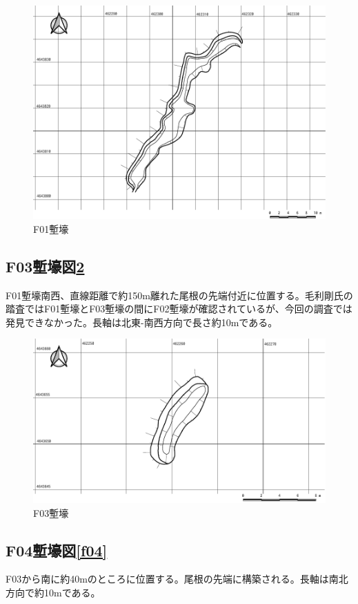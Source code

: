 \documentclass[14Q]{jsarticle}
\begin{document}
\begin{figure}[h]
\centering
\includegraphics[width=160truemm]{fig/F01.pdf}
\caption{F01塹壕}
\label{f01}
\end{figure}

\subsection{F03塹壕図\ref{f03}}
F01塹壕南西、直線距離で約150m離れた尾根の先端付近に位置する。毛利剛氏の踏査ではF01塹壕とF03塹壕の間にF02塹壕が確認されているが、今回の調査では発見できなかった。長軸は北東-南西方向で長さ約10mである。

\begin{figure}[h]
\centering
\includegraphics[width=160truemm]{fig/F03.pdf}
\caption{F03塹壕}
\label{f03}
\end{figure}

\subsection{F04塹壕図\ref{f04}}
F03から南に約40mのところに位置する。尾根の先端に構築される。長軸は南北方向で約10mである。
\end{document}
